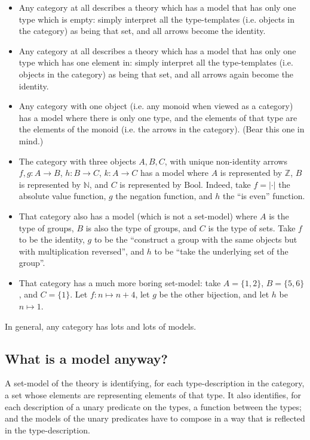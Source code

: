 \documentclass[11pt]{amsart}
\begin{document}
    \begin{itemize}
        \item Any category at all describes a theory which has a model that has only one type which is empty: simply interpret all the type-templates (i.e. objects in the category) as being that set, and all arrows become the identity.
        \item Any category at all describes a theory which has a model that has only one type which has one element in: simply interpret all the type-templates (i.e. objects in the category) as being that set, and all arrows again become the identity.
        \item Any category with one object (i.e. any monoid when viewed as a category) has a model where there is only one type, and the elements of that type are the elements of the monoid (i.e. the arrows in the category). (Bear this one in mind.)
        \item The category with three objects $A, B, C$, with unique non-identity arrows $f, g : A \to B$, $h : B \to C$, $k : A \to C$ has a model where $A$ is represented by $\mathbb{Z}$, $B$ is represented by $\mathbb{N}$, and $C$ is represented by $\mathrm{Bool}$.
            Indeed, take $f = |\cdot|$ the absolute value function, $g$ the negation function, and $h$ the ``is even'' function.
        \item That category also has a model (which is not a set-model) where $A$ is the type of groups, $B$ is also the type of groups, and $C$ is the type of sets.
            Take $f$ to be the identity, $g$ to be the ``construct a group with the same objects but with multiplication reversed'', and $h$ to be ``take the underlying set of the group''.
        \item That category has a much more boring set-model: take $A = \{1,2\}$, $B = \{5, 6\}$, and $C = \{1\}$.
            Let $f : n \mapsto n+4$, let $g$ be the other bijection, and let $h$ be $n \mapsto 1$.
    \end{itemize}

    In general, any category has lots and lots of models.

    \subsection{What is a model anyway?}

    A set-model of the theory is identifying, for each type-description in the category, a set whose elements are representing elements of that type.
    It also identifies, for each description of a unary predicate on the types, a function between the types; and the models of the unary predicates have to compose in a way that is reflected in the type-description.
\end{document}
